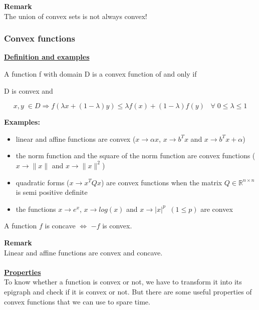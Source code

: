 \documentclass{article}
\begin{document}
\textbf{Remark}\\
The union of convex sets is not always convex! 
\\

\subsubsection{Convex functions}
\underline{\textbf{Definition and examples}}
\begin{mydef}
A function f with domain D is a convex function of and only if \\
\begin{center}
D is convex and 
\end{center}
$$x,y\; \in D \Rightarrow f(\lambda x+(1-\lambda)y) \le \lambda f(x)+(1-\lambda)f(y) \;\;\; \forall \; 0\le \lambda \le 1$$
\end{mydef}

\textbf{Examples:}
\begin{itemize}
\item linear and affine functions are convex ($x \rightarrow \alpha x$,  $x\rightarrow b^Tx$  and  $x \rightarrow b^Tx+\alpha$)
\item the norm function and the square of the norm function are convex functions ($x \rightarrow \|x\|$ and $x \rightarrow \|x\|^2$)
\item quadratic forms ($x \rightarrow x^TQx$) are convex functions when the matrix $Q \in \mathbb{R}^{n\times n}$ is semi positive definite
\item the functions $x \rightarrow e^x$,  $x\rightarrow log(x)$ and $x \rightarrow |x|^p \;\;(1 \le p)$ are convex
\end{itemize}


\begin{mydef}
A function $f$ is concave $\Leftrightarrow$ $-f$ is convex.
\end{mydef}

\textbf{Remark}\\
Linear and affine functions are convex and concave. 
\\
\\

\underline{\textbf{Properties}}\\

To know whether a function is convex or not, we have to transform it into its epigraph and check if it is convex or not. But there are some useful properties of convex functions that we can use to spare time. 
\end{document}
